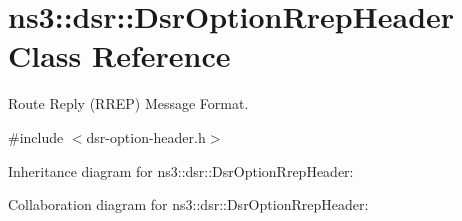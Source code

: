 \hypertarget{classns3_1_1dsr_1_1DsrOptionRrepHeader}{}\section{ns3\+:\+:dsr\+:\+:Dsr\+Option\+Rrep\+Header Class Reference}
\label{classns3_1_1dsr_1_1DsrOptionRrepHeader}


Route Reply (R\+R\+EP) Message Format.  




{\ttfamily \#include $<$dsr-\/option-\/header.\+h$>$}



Inheritance diagram for ns3\+:\+:dsr\+:\+:Dsr\+Option\+Rrep\+Header\+:


Collaboration diagram for ns3\+:\+:dsr\+:\+:Dsr\+Option\+Rrep\+Header\+:
